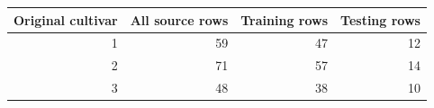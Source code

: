 \begin{tabular}{@{}rrrr@{}}
\toprule
Original cultivar & All source rows & Training rows & Testing rows \\
\midrule
1 & 59 & 47 & 12 \\
2 & 71 & 57 & 14 \\
3 & 48 & 38 & 10 \\
\bottomrule
\end{tabular}
